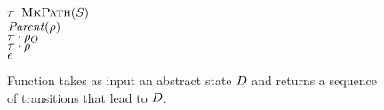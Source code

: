 \begin{figure}[t]
\begin{minipage}[t]{.94\columnwidth}
    \tabTT $\pi$ \algAssgn $\textsc{MkPath}(S)$\\
    \tabTT \algMatch $\mathit{Parent}(\rho)$ \algWith\\
    \tabTT \algCase{$(\StateOrig, \OrigRel)$} \algReturn $\pi \cdot \rho_{O}$\\
    \tabTT \algCase{$\bot$} \algReturn $\pi\cdot\rho$\\
    \tabT \algCase{$\bot$} \algReturn $\epsilon$ \hfill 
    \\
    \algEnd
  \end{minipage}
  \vspace{1ex}
  \linespread{1}
  \caption{Function \algCexPath takes as input an abstract state
    $D$ and returns a sequence of transitions that lead to
    $D$.
  }
  \label{fig-alg-cex-path}
\end{figure}
